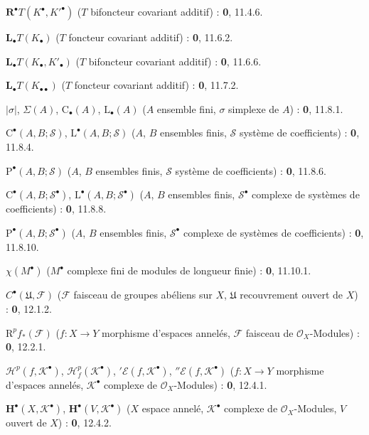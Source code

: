 \begin{flushleft}
$\mathbf R^\bullet T(K^\bullet,K'^{\bullet})$ ($T$ bifoncteur covariant
additif) : \textbf{0}, 11.4.6.

$\mathbf L_\bullet T(K_\bullet)$ ($T$ foncteur covariant additif) : \textbf{0}, 11.6.2.

$\mathbf L_\bullet T(K_\bullet,K'_\bullet)$ ($T$ bifoncteur covariant
additif) : \textbf{0}, 11.6.6.

$\mathbf L_\bullet T(K_{\bullet\bullet})$ ($T$ foncteur covariant additif) :
\textbf{0}, 11.7.2.

$|\sigma|$, $\Sigma(A)$, $\mathrm C_\bullet(A)$, $\mathrm L_\bullet(A)$ ($A$ ensemble fini,
$\sigma$ simplexe de $A$) : \textbf{0}, 11.8.1.

$\mathrm C^\bullet(A,B;\mathscr S)$, $\mathrm L^\bullet(A,B;\mathscr S)$ ($A$, $B$ ensembles
finis, $\mathscr S$ système de coefficients) : \textbf{0}, 11.8.4.

$\mathrm P^\bullet(A,B;\mathscr S)$ ($A$, $B$ ensembles finis, $\mathscr S$ système
de coefficients) : \textbf{0}, 11.8.6.

$\mathrm C^\bullet(A,B;\mathscr S^\bullet)$,
$\mathrm L^\bullet(A,B;\mathscr S^\bullet)$ ($A$, $B$ ensembles finis,
$\mathscr S^\bullet$ complexe de systèmes de coefficients) : \textbf{0}, 11.8.8.

$\mathrm P^\bullet(A,B;\mathscr S^\bullet)$ ($A$, $B$ ensembles finis,
$\mathscr S^\bullet$ complexe de systèmes de coefficients) : \textbf{0}, 11.8.10.

$\chi(M^\bullet)$ ($M^\bullet$ complexe fini de modules de longueur finie) :
\textbf{0}, 11.10.1.

$C^\bullet(\mathfrak U,\mathcal F)$ ($\mathcal F$ faisceau de groupes abéliens
sur $X$, $\mathfrak U$ recouvrement ouvert de $X$) : \textbf{0}, 12.1.2.

$\mathrm R^pf_*(\mathcal F)$ ($f:X\to Y$ morphisme d'espaces annelés,
$\mathcal F$ faisceau de $\mathcal O_X$-Modules) : \textbf{0}, 12.2.1.

$\mathscr H^p(f,\mathcal K^\bullet)$,
$\mathscr H_f^p(\mathcal K^\bullet)$, ${}'\mathcal E(f,\mathcal K^\bullet)$,
${}''\mathcal E(f,\mathcal K^\bullet)$ ($f:X\to Y$ morphisme d'espaces
annelés, $\mathcal K^\bullet$ complexe de $\mathcal O_X$-Modules) : \textbf{0}, 12.4.1.

$\mathbf H^\bullet(X,\mathcal K^\bullet)$,
$\mathbf H^\bullet(V,\mathcal K^\bullet)$ ($X$ espace annelé,
$\mathcal K^\bullet$ complexe de $\mathcal O_X$-Modules, $V$ ouvert de $X$) :
\textbf{0}, 12.4.2.


\end{flushleft}
